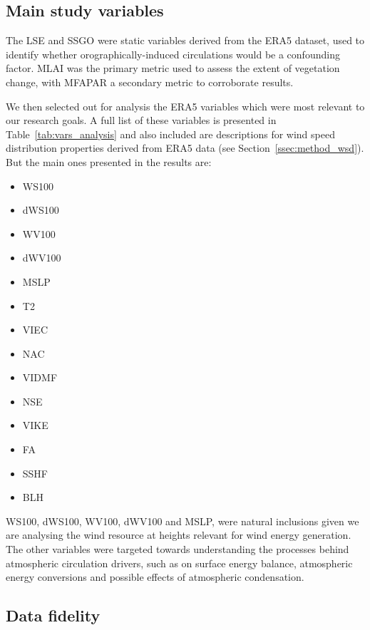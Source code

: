 \subsection{Main study variables}

The \acf{LSE} and \acf{SSGO} were static variables derived from the \ac{ERA5} dataset, used to identify whether orographically-induced circulations would be a confounding factor. \acf{MLAI} was the primary metric used to assess the extent of vegetation change, with \acf{MFAPAR} a secondary metric to corroborate results. 

We then selected out for analysis the \ac{ERA5} variables which were most relevant to our research goals. A full list of these variables is presented in Table~\ref{tab:vars_analysis} and also included are descriptions for wind speed distribution properties derived from \ac{ERA5} data (see Section~\ref{ssec:method_wsd}). But the main ones presented in the results are:
\begin{itemize}
	\item \acf{WS100}
	\item \acf{dWS100}
	\item \acf{WV100}
	\item \acf{dWV100}
	\item \acf{MSLP}
	\item \acf{T2}
	\item \acf{VIEC}
	\item \acf{NAC}
	\item \acf{VIDMF}
	\item \acf{NSE}
	\item \acf{VIKE}
	\item \acf{FA}
	\item \acf{SSHF}
	\item \acf{BLH}
\end{itemize}

\ac{WS100}, \ac{dWS100}, \ac{WV100}, \ac{dWV100} and \ac{MSLP}, were natural inclusions given we are analysing the wind resource at heights relevant for wind energy generation. The other variables were targeted towards understanding the processes behind atmospheric circulation drivers, such as on surface energy balance, atmospheric energy conversions and possible effects of atmospheric condensation.

\subsection{Data fidelity}

